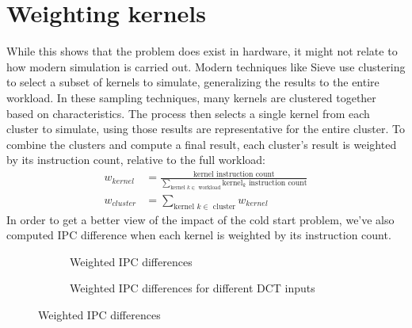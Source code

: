 \section{Weighting kernels}\label{sec:weighting-kernels}
While this shows that the problem does exist in hardware, it might not relate to how modern simulation is carried out.
Modern techniques like Sieve\cite{sieve} use clustering to select a subset of kernels to simulate, generalizing the results to the entire workload.
In these sampling techniques, many kernels are clustered together based on characteristics.
The process then selects a single kernel from each cluster to simulate, using those results are representative for the entire cluster.
To combine the clusters and compute a final result, each cluster's result is weighted by its instruction count, relative to the full workload:
\begin{align*}
    w_{kernel} &= \frac{\text{kernel instruction count}}{\sum_{\text{kernel } k \in \text{ workload}}{\text{kernel}_k \text{ instruction count}}} \\
    w_{cluster} &= \sum_{\text{kernel } k \in \text{ cluster}} w_{kernel}
\end{align*}
In order to get a better view of the impact of the cold start problem, we've also computed IPC difference when each kernel is weighted by its instruction count.

\begin{figure}[t]
    \centering
    \begin{subfigure}{\textwidth}
        \begin{minipage}[c]{0.45\textwidth}
            \resizebox{\textwidth}{!}{}
        \end{minipage}
        \begin{minipage}[c]{0.45\textwidth}
            \resizebox{\textwidth}{!}{}
        \end{minipage}
        \caption{Weighted IPC differences}
        \label{fig:weight_ipc_diff}
    \end{subfigure}
    \centering
    \begin{subfigure}{\textwidth}
        \begin{minipage}[c]{0.45\textwidth}
            \resizebox{\textwidth}{!}{}
        \end{minipage}
        \begin{minipage}[c]{0.45\textwidth}
            \resizebox{\textwidth}{!}{}
        \end{minipage}
        \caption{Weighted IPC differences for different DCT inputs}
        \label{fig:weight_ipc_dct}
    \end{subfigure}
    \caption{Weighted IPC differences}
\end{figure}

